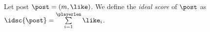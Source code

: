 \begin{definition}
  Let post $\post = \left(m, \like\right)$. We define the \emph{ideal score} of
  $\post$ as $\idsc{\post} = \sum\limits_{i = 1}^\playerlen \like_i$.
\end{definition}
